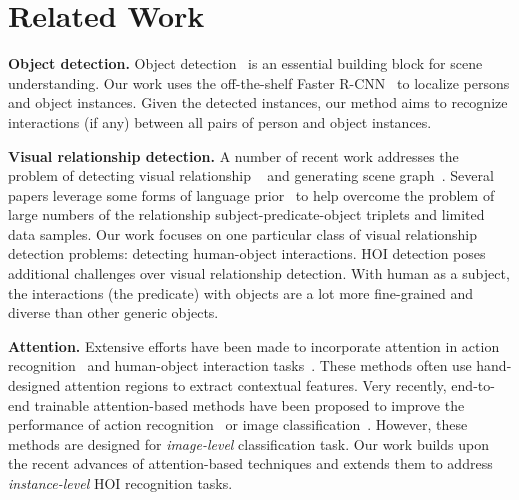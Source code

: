\documentclass{bmvc2k}
\newlength\secmargin
\newcommand {\para}[1]{\vspace{1.5mm} \noindent \textbf{#1}}
\begin{document}
\section{Related Work}
\label{sec:related}
\vspace{\secmargin}



\para{Object detection.}
Object detection~\cite{Dai-NIPS-RFCN,Ross-CVPR-FastRCNN,Ross-CVPR-Hierarchies,Lin-CVPR-Pyramid,Ren-NIPS-FasterRCNN} is an essential building block for scene understanding.
Our work uses the off-the-shelf Faster R-CNN~\cite{Ren-NIPS-FasterRCNN,Detectron} to localize persons and object instances. 
Given the detected instances, our method aims to recognize interactions (if any) between all pairs of person and object instances.


\para{Visual relationship detection.} 
A number of recent work addresses the problem of detecting visual relationship ~\cite{Bilen-CVPR-Weakly,Dai-CVPR-Relationship,Hu-CVPR-Referential,Li-CVPR-VIP,Zhang-ICCV-PPR,Peyre-ICCV-Weakly,Zhuang-ICCV-ContextAware,kolesnikov2018detecting} and generating scene graph~\cite{Xu-CVPR-SceneGraph,li2017scene,zellers2018neural}.
Several papers leverage some forms of language prior~\cite{Lu-ECCV-Prior,Plummer-ICCV-Phrase} to help overcome the problem of large numbers of the relationship subject-predicate-object triplets and limited data samples.
Our work focuses on one particular class of visual relationship detection problems: detecting human-object interactions.
HOI detection poses additional challenges over visual relationship detection. 
With human as a subject, the interactions (\ie the predicate) with objects are a lot more fine-grained and diverse than other generic objects.

\para{Attention.} Extensive efforts have been made to incorporate attention in action recognition~\cite{Gkioxari-ICCV-R*CNN,Cheron-ICCV-PCNN} and human-object interaction tasks~\cite{Lu-ECCV-Prior,Mallya-ECCV-Interactions}.
These methods often use hand-designed attention regions to extract contextual features. Very recently, end-to-end trainable attention-based methods have been proposed to improve the performance of action recognition~\cite{Girdhar-NIPS-AttentionalPooling} or image classification~\cite{Jetley-ICLR-PayAttention}.
However, these methods are designed for \textit{image-level} classification task.
Our work builds upon the recent advances of attention-based techniques and extends them to address \emph{instance-level} HOI recognition tasks.
\end{document}
